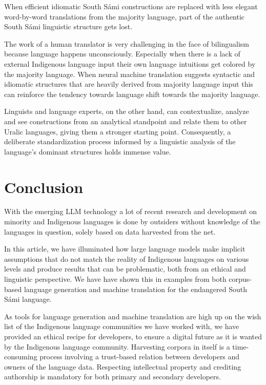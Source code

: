 \documentclass[free]{flammie}
\begin{document}
When efficient idiomatic South Sámi constructions are replaced with less elegant
word-by-word translations from the majority language, part of the authentic
South Sámi linguistic structure gets lost.

The work of a human translator is very challenging in the face of bilingualism
because language happens unconsciously. Especially when there is a lack of
external Indigenous language input their own language intuitions get colored by
the majority language.  When neural machine translation suggests syntactic and
idiomatic structures that are heavily derived from majority language input this
can reinforce the tendency towards language shift towards the majority language.

Linguists and language experts, on the other hand, can contextualize, analyze
and see constructions from an analytical standpoint and relate them to other
Uralic languages, giving them a stronger starting point.  Consequently, a
deliberate standardization process informed by a linguistic analysis of the
language's dominant structures holds immense value.

\section{Conclusion}

With the emerging LLM technology a lot of recent research and development on
minority and Indigenous languages is done by outsiders without knowledge of the
languages in question, solely based on data harvested from the net.

In this article, we have illuminated how large language models make implicit
assumptions that do not match the reality of Indigenous languages on various
levels and produce results that can be  problematic, both from an ethical and
linguistic perspective.  We have have shown this in examples from both
corpus-based language generation and machine translation for the endangered
South Sámi language.

As tools for language generation and machine translation are high up on the wish
list of the Indigenous language communities we have worked with, we have
provided an ethical recipe for developers, to ensure a digital future as it is
wanted by the Indigenous language community.  Harvesting corpora in itself is a
time-consuming process involving a trust-based relation between developers and
owners of the language data.  Respecting intellectual property and crediting
authorship is mandatory for both primary and secondary developers.
\end{document}
